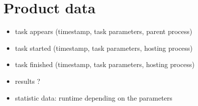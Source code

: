 {


\setcounter{funcD}{10}
\renewcommand{\labelitemi}{
	\ifnum \value{funcD}<10$/D 0\arabic{funcD} /$\addtocounter{funcD}{10}
	\else $/D \arabic{funcD} /$\addtocounter{funcD}{10}\fi
	}
\section{Product data}
	\begin{itemize}
		\item task appears (timestamp, task parameters, parent process)
		\item task started (timestamp, task parameters, hosting process)
		\item task finished (timestamp, task parameters, hosting process)
		\item results ?
		\item statistic data: runtime depending on the parameters
	
	\end{itemize}

}
